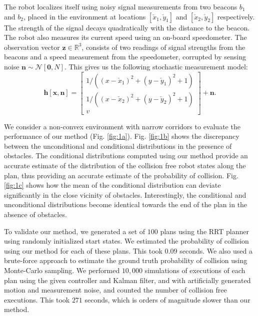 The robot localizes itself using noisy signal measurements from two beacons $b_1$ and $b_2$, placed in the environment at locations $[\check{x}_1, \check{y}_1]$ and $[\check{x}_2, \check{y}_2]$ respectively. The strength of the signal decays quadratically with the distance to the beacon. The robot also measures its current speed using an on-board speedometer. The observation vector $\mathbf{z} \in \mathbb{R}^3$, consists of two readings of signal strengths from the beacons and a speed measurement from the speedometer, corrupted by sensing noise $\mathbf{n} \sim \mathcal{N}[\mathbf{0}, N]$. This gives us the following stochastic measurement model:
\begin{equation}
\mathbf{h}[\mathbf{x}, \mathbf{n}] = \begin{bmatrix} 1/((x - \check{x}_1)^2 + (y - \check{y}_1)^2 + 1) \\ 1/((x - \check{x}_2)^2 + (y - \check{y}_2)^2 + 1) \\ v \end{bmatrix} + \mathbf{n}.
\end{equation}

We consider a non-convex environment with narrow corridors to evaluate the performance of our method (Fig. \ref{fig:1a}). Fig. \ref{fig:1b} shows the discrepancy between the unconditional and conditional distributions in the presence of obstacles. The conditional distributions computed using our method provide an accurate estimate of the distribution of the collision free robot states along the plan, thus providing an accurate estimate of the probability of collision. Fig. \ref{fig:1c} shows how the mean of the conditional distribution can deviate significantly in the close vicinity of obstacles. Interestingly, the conditional and unconditional distributions become identical towards the end of the plan in the absence of obstacles.

To validate our method, we generated a set of $100$ plans using the RRT planner using randomly initialized start states. We estimated the probability of collision using our method for each of these plans. This took $0.09$ seconds. We also used a brute-force approach to estimate the ground truth probability of collision using Monte-Carlo sampling. We performed $10,000$ simulations of executions of each plan using the given controller and Kalman filter, and with artificially generated motion and measurement noise, and counted the number of collision free executions. This took $271$ seconds, which is orders of magnitude slower than our method.

